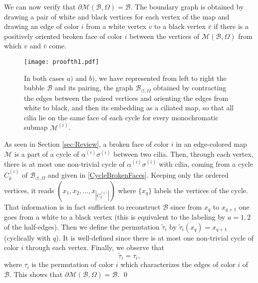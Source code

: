 \documentclass[aps,prd,10pt,notitlepage,nofootinbib,superscriptaddress,showkeys,showpacs]{revtex4-1}
\begin{document}
We can now verify that $\partial {\mathcal{M}}({\mathcal{B}}, \Omega) = {\mathcal{B}}$. The boundary graph is obtained by drawing a pair of white and black vertices for each vertex of the map and drawing an edge of color $i$ from a white vertex $v$ to a black vertex $\bar{v}$ if there is a positively oriented broken face of color $i$ between the vertices of ${\mathcal{M}}({\mathcal{B}}, \Omega)$ from which $v$ and $\bar{v}$ come.

\begin{figure}
\texttt{[image: proofth1.pdf]}
\caption{\label{fig:FromBubbleToMap} In both cases $a)$ and $b)$, we have represented from left to right the bubble ${\mathcal{B}}$ and its pairing, the graph ${\mathcal{B}}_{\circlearrowleft, \Omega}$ obtained by contracting the edges between the paired vertices and orienting the edges from white to black, and then its embedding as a ciliated map, so that all cilia lie on the same face of each cycle for every monochromatic submap ${\mathcal{M}}^{(i)}$.}
\end{figure}

As seen in Section \ref{sec:Review}, a broken face of color $i$ in an edge-colored map ${\mathcal{M}}$ is a part of a cycle of $\alpha^{(i)} \sigma^{(i)}$ between two cilia. Then, through each vertex, there is at most one non-trivial cycle of $\alpha^{(i)} \sigma^{(i)}$ with cilia, coming from a cycle $C^{(i)}_k$ of ${\mathcal{B}}_{\circlearrowleft, \Omega}$ and given in \eqref{CycleBrokenFaces}. Keeping only the ordered vertices, it reads $(x_1, x_2, \dotsc, x_{|C^{(i)}_k|})$ where $\{x_q\}$ labels the vertices of the cycle. That information is in fact sufficient to reconstruct ${\mathcal{B}}$ since from $x_q$ to $x_{q+1}$ one goes from a white to a black vertex (this is equivalent to the labeling by $a=1, 2$ of the half-edges). Then we define the permutation $\tilde{\tau}_i$ by $\tilde{\tau}_i(x_q) = x_{q+1}$ (cyclically with $q$). It is well-defined since there is at most one non-trivial cycle of color $i$ through each vertex. Finally, we observe that
\begin{equation} \label{BrokenFacesVsEdges}
\tilde{\tau}_i = \tau_i,
\end{equation}
where $\tau_i$ is the permutation of color $i$ which characterizes the edges of color $i$ of ${\mathcal{B}}$. This shows that $\partial {\mathcal{M}}({\mathcal{B}}, \Omega) = {\mathcal{B}}$.
\qed
\end{document}
